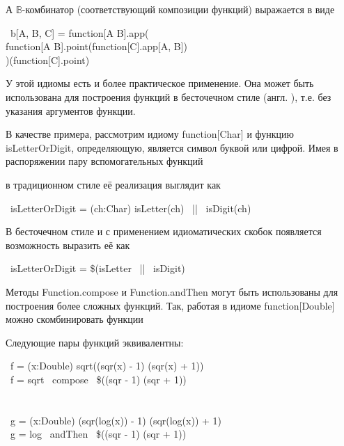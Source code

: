 А $\mathds{B}$-комбинатор (соответствующий композиции функций) выражается в виде
\begin{haskell}
 ~b[A, B, C] = function[A \Rightarrow B].app( \\
\quad\quad function[A \Rightarrow B].point(function[C].app[A, B]) \\
)(function[C].point)
\end{haskell}

У этой идиомы есть и более практическое применение. Она может быть использована для построения функций в бесточечном стиле (англ. ), т.е. без указания аргументов функции.

В качестве примера, рассмотрим идиому \<function[Char]\> и функцию \<isLetterOrDigit\>, определяющую, является символ буквой или цифрой. Имея в распоряжении пару вспомогательных функций
\begin{haskell}
\end{haskell}
в традиционном стиле её реализация выглядит как
\begin{haskell}
   ~isLetterOrDigit = (ch:Char) \Rightarrow isLetter(ch) ~|| ~isDigit(ch)
\end{haskell}

В бесточечном стиле и с применением идиоматических скобок появляется возможность выразить её как
\begin{haskell}
   ~isLetterOrDigit = \$(isLetter ~|| ~isDigit)
\end{haskell}

Методы \<Function.compose\> и \<Function.andThen\> могут быть использованы для построения более сложных функций. Так, работая в идиоме \<function[Double]\> можно скомбинировать функции
\begin{haskell}
\end{haskell}

Следующие пары функций эквивалентны:
\begin{haskell}
   ~f = (x:Double) \Rightarrow sqrt((sqr(x) - 1) \div (sqr(x) + 1)) \\
   ~f = sqrt ~compose ~\$((sqr - 1) \div (sqr + 1)) \\
  \\ \\ 
   ~g = (x:Double) \Rightarrow (sqr(log(x)) - 1) \div (sqr(log(x)) + 1) \\
   ~g = log ~andThen ~\$((sqr - 1) \div (sqr + 1))
\end{haskell}

